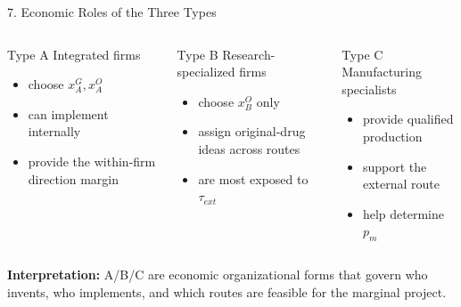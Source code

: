 \documentclass[aspectratio=169,11pt]{beamer}
\begin{document}
\begin{frame}{7. Economic Roles of the Three Types}
\small
\begin{columns}[T]
\begin{block}{Type A}
Integrated firms
\begin{itemize}
\item choose \(x_A^G,x_A^O\)
\item can implement internally
\item provide the within-firm direction margin
\end{itemize}
\end{block}

\begin{block}{Type B}
Research-specialized firms
\begin{itemize}
\item choose \(x_B^O\) only
\item assign original-drug ideas across routes
\item are most exposed to \(\tau_{ext}\)
\end{itemize}
\end{block}

\begin{block}{Type C}
Manufacturing specialists
\begin{itemize}
\item provide qualified production
\item support the external route
\item help determine \(p_m\)
\end{itemize}
\end{block}
\end{columns}

\vspace{0.25cm}
\textbf{Interpretation:} A/B/C are economic organizational forms that govern who invents, who implements, and which routes are feasible for the marginal project.
\end{frame}
\end{document}
